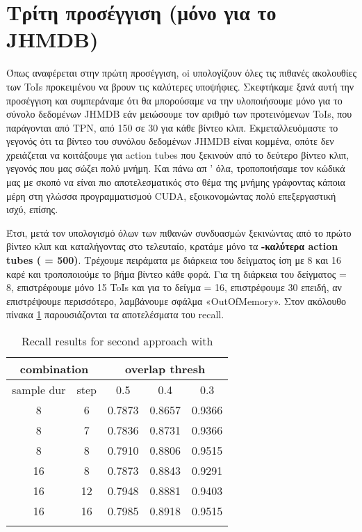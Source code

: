 \section{Tρίτη προσέγγιση (μόνο για το \en JHMDB)\gr}
Όπως αναφέρεται στην πρώτη προσέγγιση, oi \en\cite{DBLP:journals/corr/HouCS17} \gr υπολογίζουν όλες τις πιθανές ακολουθίες των \en ToIs \gr
προκειμένου να βρουν τις καλύτερες υποψήφιες. Σκεφτήκαμε ξανά αυτή την προσέγγιση και συμπεράναμε ότι θα μπορούσαμε  να την υλοποιήσουμε
μόνο για το σύνολο δεδομένων \en JHMDB \gr εάν μειώσουμε τον αριθμό των προτεινόμενων \en ToIs\gr, που παράγονται  από \en TPN\gr,
από 150 σε 30 για κάθε βίντεο κλιπ. Εκμεταλλευόμαστε το γεγονός ότι τα βίντεο του συνόλου δεδομένων \en JHMDB \gr είναι κομμένα, οπότε δεν
χρειάζεται να κοιτάξουμε για \en action tubes \gr που ξεκινούν από το δεύτερο βίντεο κλιπ, γεγονός  που μας σώζει πολύ μνήμη.
Και πάνω απ ' όλα, τροποποιήσαμε τον κώδικά μας με σκοπό να είναι πιο αποτελεσματικός στο θέμα της  μνήμης   γράφοντας κάποια μέρη στη γλώσσα προγραμματισμού \en CUDA\gr, εξοικονομώντας πολύ επεξεργαστική ισχύ, επίσης.  \par
Έτσι, μετά τον υπολογισμό  όλων των πιθανών συνδυασμών ξεκινώντας από το πρώτο βίντεο κλιπ και καταλήγοντας στο τελευταίο, κρατάμε μόνο τα
\textbf{-καλύτερα \en action tubes \gr ( = 500)}. Τρέχουμε πειράματα με  διάρκεια του δείγματος ίση με 8 και 16 καρέ και τροποποιούμε  το βήμα βίντεο κάθε φορά.
Για τη διάρκεια του δείγματος = 8, επιστρέφουμε μόνο 15 \en ToIs \gr και για το δείγμα  = 16, επιστρέφουμε 30 επειδή, αν επιστρέψουμε περισσότερο,
λαμβάνουμε σφάλμα \en «OutOfMemory»\gr. 
Στον ακόλουθο πίνακα \ref{table:gr_gr_conn_app3} παρουσιάζονται τα αποτελέσματα του \en recall\gr.
\begin{center}
\en
\begin{longtable}{||c c||c c c||}

  \hline
  \multicolumn{2}{||c||}{\textbf{combination}} &\multicolumn{3}{|c||}{\textbf{overlap thresh}}\\
  \hline
  sample dur & step &  0.5  &  0.4 &  0.3 \\
  \hline   \hline

  8 & 6 & 0.7873 & 0.8657 & 0.9366  \\
  \hline
  8 & 7 & 0.7836 & 0.8731 & 0.9366  \\
  \hline
  8 &  8 & 0.7910 & 0.8806 & 0.9515 \\
  \hline 

  16 & 8  & 0.7873 & 0.8843 & 0.9291 \\
  \hline
  16 & 12 & 0.7948 & 0.8881 & 0.9403 \\
  \hline
  16 & 16 & 0.7985 & 0.8918 & 0.9515 \\
  \hline \hline
  \caption{Recall results for second approach with  }
  \label{table:gr_gr_conn_app3}
\end{longtable} 
\end{center}

